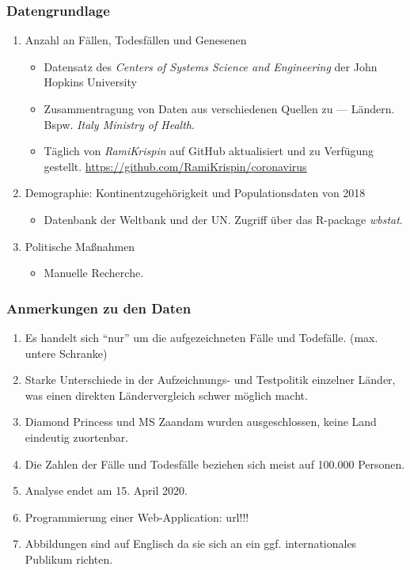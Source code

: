 \documentclass{beamer}
\begin{document}
 \begin{frame}
 	\frametitle{Datengrundlage}
 	\begin{enumerate}
 		\item Anzahl an Fällen, Todesfällen und Genesenen
 		\begin{itemize}
 			\item Datensatz des \emph{Centers of Systems Science and Engineering} der John Hopkins University
 			\item Zusammentragung von Daten aus verschiedenen Quellen zu --- Ländern. Bspw. \emph{Italy Ministry of Health}.
 			\item Täglich von \emph{RamiKrispin} auf GitHub aktualisiert und zu Verfügung gestellt. \url{https://github.com/RamiKrispin/coronavirus}
 	\pause
 		\end{itemize}
 		\item Demographie: Kontinentzugehörigkeit und Populationsdaten von 2018
 		\begin{itemize}
 			\item Datenbank der Weltbank und der UN. Zugriff über das R-package \emph{wbstat}.
 		\end{itemize}
 	\pause
 		\item Politische Maßnahmen
 		\begin{itemize}
 			\item Manuelle Recherche.
 		\end{itemize}
 	\end{enumerate} 
 \end{frame}

 \begin{frame}
 	\frametitle{Anmerkungen zu den Daten}
 	\begin{enumerate}
 		\item Es handelt sich ``nur'' um die aufgezeichneten Fälle und Todefälle. (max. untere Schranke)
 		\item Starke Unterschiede in der Aufzeichnungs- und Testpolitik einzelner Länder, was einen direkten Ländervergleich schwer möglich macht. 
 		\item Diamond Princess und MS Zaandam wurden ausgeschlossen, keine Land eindeutig zuortenbar. 
 		\item Die Zahlen der Fälle und Todesfälle beziehen sich meist auf 100.000 Personen.
 		\item Analyse endet am 15. April 2020.
 		\pause
 		\vspace{1cm}
 		\item Programmierung einer Web-Application: url!!!
 		\item Abbildungen sind auf Englisch da sie sich an ein ggf. internationales Publikum richten.
 	\end{enumerate}
 \end{frame}
 
\end{document}
